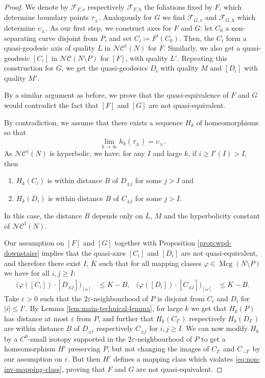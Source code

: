 \documentclass[a4paper]{article}
\let\epsilon\varepsilon %
\newcommand{\ncg}{\mathcal{NC}}
\newcommand{\fncg}{\mathcal{NC}^\dagger}
\begin{document}
\begin{proof}
We denote by $\mathcal{F}_{F,v}$ respectively $\mathcal{F}_{F,h}$ the foliations fixed by $F$, which determine boundary points $\tau_\pm$.
Analogously for $G$ we find $\mathcal{F}_{G,v}$ and $\mathcal{F}_{G,h}$ which determine $\upsilon_\pm$.
As our first step, we construct axes for $F$ and $G$:
let $C_0$ a non-separating curve disjoint from $P$, and set $C_i \coloneqq F^i(C_0)$.
Then, the $C_i$ form a quasi-geodesic axis of quality $L$ in $\fncg(N)$ for $F$.
Similarly, we also get a quasi-geodesic $[C_i]$ in $\ncg(N\setminus P)$ for $[F]$, with quality $L'$.
Repeating this construction for $G$, we get the quasi-geodesics $D_i$ with quality $M$ and $[D_i]$ with quality $M'$.

By a similar argument as before, we prove that the quasi-equivalence of $F$ and $G$ would contradict the fact that $[F]$ and $[G]$ are not quasi-equivalent.

By contradiction, we assume that there exists a sequence $H_k$ of homeomorphisms so that
\[\lim_{k\to\infty} h_k(\tau_\pm) = \upsilon_\pm.\]
As $\fncg(N)$ is hyperbolic, we have:
for any $I$ and large $k$, if $i\geq I'(I) > I$, then \begin{enumerate}
    \item $H_k(C_i)$ is within distance $B$ of $D_{\pm j}$ for some $j>I$ and
    \item $H_k(D_{i})$ is within distance $B$ of $C_{\pm j}$ for some $j>I$.
\end{enumerate}
In this case, the distance $B$ depends only on $L$, $M$ and the hyperbolicity constant of $\fncg(N)$.

Our assumption on $[F]$ and $[G]$ together with Proposition \ref{prop:wpd-downstairs} implies that the quasi-axes $[C_i]$ and $[D_i]$ are not quasi-equivalent, and therefore there exist $I$, $K$ such that for all mapping classes $\varphi\in\operatorname{Mcg}(N\setminus P)$ we have for all $i,j\geq I$:
\begin{align}\label{eq:non-inv-mapping-class} \big(\varphi([C_i])\cdot [D_{\pm j}]\big)_{[\omega]} &\leq K - B, & \big(\varphi([D_{i}])\cdot [C_{\pm j}]\big)_{[\omega]} &\leq K - B.\end{align}
Take $\epsilon>0$ such that the $2\epsilon$-neighbourhood of $P$ is disjoint from $C_i$ and $D_i$ for $\lvert i \rvert \leq I'$.
By Lemma \ref{lem:main-technical-lemma}, for large $k$ we get that $H_k(P)$ has distance at most $\epsilon$ from $P$, and further that $H_k(C_{I'})$ respectively $H_k(D_{I'})$ are within distance $B$ of $D_{\pm i}$ respectively $C_{\pm j}$ for $i,j\geq I$.
We can now modify $H_k$ by a $C^0$-small isotopy supported in the $2\epsilon$-neighbourhood of $P$ to get a homeomorphism $H'$ preserving $P$, but not changing the images of $C_{I'}$ and $C_{-I'}$ by our assumption on $\epsilon$.
But then $H'$ defines a mapping class which violates \eqref{eq:non-inv-mapping-class}, proving that $F$ and $G$ are not quasi-equivalent.
\end{proof}
\end{document}
